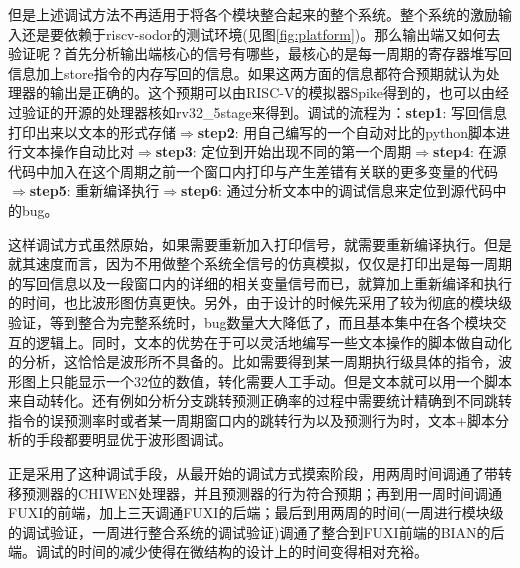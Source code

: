 	但是上述调试方法不再适用于将各个模块整合起来的整个系统。整个系统的激励输入还是要依赖于riscv-sodor的测试环境(见图\ref{fig:platform})。那么输出端又如何去验证呢？首先分析输出端核心的信号有哪些，最核心的是每一周期的寄存器堆写回信息加上store指令的内存写回的信息。如果这两方面的信息都符合预期就认为处理器的输出是正确的。这个预期可以由RISC-V的模拟器Spike得到的，也可以由经过验证的开源的处理器核如rv32\_5stage来得到。调试的流程为：\textbf{step1}: 写回信息打印出来以文本的形式存储$ \Rightarrow $\textbf{step2}: 用自己编写的一个自动对比的python脚本进行文本操作自动比对$ \Rightarrow $\textbf{step3}: 定位到开始出现不同的第一个周期$ \Rightarrow $\textbf{step4}: 在源代码中加入在这个周期之前一个窗口内打印与产生差错有关联的更多变量的代码$ \Rightarrow $\textbf{step5}: 重新编译执行$ \Rightarrow $\textbf{step6}: 通过分析文本中的调试信息来定位到源代码中的bug。
	
	这样调试方式虽然原始，如果需要重新加入打印信号，就需要重新编译执行。但是就其速度而言，因为不用做整个系统全信号的仿真模拟，仅仅是打印出是每一周期的写回信息以及一段窗口内的详细的相关变量信号而已，就算加上重新编译和执行的时间，也比波形图仿真更快。另外，由于设计的时候先采用了较为彻底的模块级验证，等到整合为完整系统时，bug数量大大降低了，而且基本集中在各个模块交互的逻辑上。同时，文本的优势在于可以灵活地编写一些文本操作的脚本做自动化的分析，这恰恰是波形所不具备的。比如需要得到某一周期执行级具体的指令，波形图上只能显示一个32位的数值，转化需要人工手动。但是文本就可以用一个脚本来自动转化。还有例如分析分支跳转预测正确率的过程中需要统计精确到不同跳转指令的误预测率时或者某一周期窗口内的跳转行为以及预测行为时，文本+脚本分析的手段都要明显优于波形图调试。
	
	正是采用了这种调试手段，从最开始的调试方式摸索阶段，用两周时间调通了带转移预测器的CHIWEN处理器，并且预测器的行为符合预期；再到用一周时间调通FUXI的前端，加上三天调通FUXI的后端；最后到用两周的时间(一周进行模块级的调试验证，一周进行整合系统的调试验证)调通了整合到FUXI前端的BIAN的后端。调试的时间的减少使得在微结构的设计上的时间变得相对充裕。